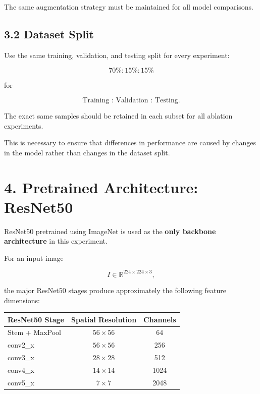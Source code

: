 \documentclass[10pt]{article}
\begin{document}
The same augmentation strategy must be maintained for all model comparisons.

\subsection*{3.2 Dataset Split}

Use the same training, validation, and testing split for every experiment:

\[
\boxed{
70\% : 15\% : 15\%
}
\]

for

\[
\text{Training : Validation : Testing}.
\]

The exact same samples should be retained in each subset for all ablation
experiments.

This is necessary to ensure that differences in performance are caused by
changes in the model rather than changes in the dataset split.

\section*{4. Pretrained Architecture: ResNet50}

ResNet50 pretrained using ImageNet is used as the
\textbf{only backbone architecture} in this experiment.

For an input image

\[
I\in\mathbb{R}^{224\times224\times3},
\]

the major ResNet50 stages produce approximately the following feature
dimensions:

\begin{center}

\begin{tabular}{|l|c|c|}
\hline
\textbf{ResNet50 Stage}
&
\textbf{Spatial Resolution}
&
\textbf{Channels}
\\
\hline

Stem + MaxPool
&
$56\times56$
&
64
\\
\hline

conv2\_x
&
$56\times56$
&
256
\\
\hline

conv3\_x
&
$28\times28$
&
512
\\
\hline

conv4\_x
&
$14\times14$
&
1024
\\
\hline

conv5\_x
&
$7\times7$
&
2048
\\
\hline

\end{tabular}

\end{center}
\end{document}

